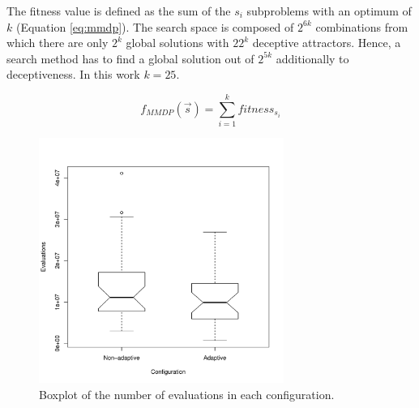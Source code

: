 The fitness value is defined as the sum of the $s_i$ subproblems with an optimum of $k$ (Equation \ref{eq:mmdp}).
The search space is composed of $2^{6k}$ combinations from which there
are only $2^k$ global solutions with $22^k$ deceptive
attractors. Hence, a search method has to find a global solution
out of $2^{5k}$ additionally to deceptiveness. In this work $k=25$. %

\begin{equation}\label{eq:mmdp}
f_{MMDP}(\vec s)= \sum_{i=1}^{k} fitness_{s_i}
\end{equation}


\begin{figure}
\centering
\includegraphics[width=8cm]{gfx/osgiliath/enabler.pdf}
\caption{Boxplot of the number of evaluations in each configuration.}
\label{fig:osgiliath:boxplot}
\end{figure}

\begin{table}
\caption{Results obtained using the Asynchronous Enabler to solve the MMDP problem.}
\label{tab:osgiliath:resultsenabler}
\end{table}



